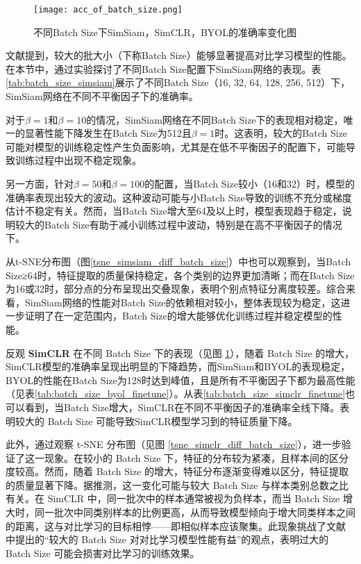 \documentclass[master]{thesis-uestc}
\begin{document}
\begin{figure}[h]
    \centering
    \texttt{[image: acc\_of\_batch\_size.png]}
    \caption{不同Batch Size下SimSiam，SimCLR，BYOL的准确率变化图}
    \label{acc_of_batch_size}
\end{figure}

文献\cite{chen2020simple}提到，较大的批大小（下称Batch Size）能够显著提高对比学习模型的性能。在本节中，通过实验探讨了不同Batch Size配置下SimSiam网络的表现。表\ref{tab:batch_size_simsiam}展示了不同Batch Size（16, 32, 64, 128, 256, 512）下，SimSiam网络在不同不平衡因子下的准确率。

对于$\beta=1$和$\beta=10$的情况，SimSiam网络在不同Batch Size下的表现相对稳定，唯一的显著性能下降发生在Batch Size为512且$\beta=1$时。这表明，较大的Batch Size可能对模型的训练稳定性产生负面影响，尤其是在低不平衡因子的配置下，可能导致训练过程中出现不稳定现象。

另一方面，针对$\beta=50$和$\beta=100$的配置，当Batch Size较小（16和32）时，模型的准确率表现出较大的波动。这种波动可能与小Batch Size导致的训练不充分或梯度估计不稳定有关。然而，当Batch Size增大至64及以上时，模型表现趋于稳定，说明较大的Batch Size有助于减小训练过程中波动，特别是在高不平衡因子的情况下。

从t-SNE分布图（图\ref{tsne_simsiam_diff_batch_size}）中也可以观察到，当Batch Size≥64时，特征提取的质量保持稳定，各个类别的边界更加清晰；而在Batch Size为16或32时，部分点的分布呈现出交叠现象，表明个别点特征分离度较差。综合来看，SimSiam网络的性能对Batch Size的依赖相对较小，整体表现较为稳定，这进一步证明了在一定范围内，Batch Size的增大能够优化训练过程并稳定模型的性能。

反观 \textbf{SimCLR} 在不同 Batch Size 下的表现（见图 \ref{acc_of_batch_size}），随着 Batch Size 的增大，SimCLR模型的准确率呈现出明显的下降趋势，而SimSiam和BYOL的表现稳定，BYOL的性能在Batch Size为128时达到峰值，且是所有不平衡因子下都为最高性能（见表\ref{tab:batch_size_byol_finetune}）。从表\ref{tab:batch_size_simclr_finetune}也可以看到，当Batch Size增大，SimCLR在不同不平衡因子的准确率全线下降。表明较大的 Batch Size 可能导致SimCLR模型学习到的特征质量下降。

此外，通过观察 t-SNE 分布图（见图 \ref{tsne_simclr_diff_batch_size}），进一步验证了这一现象。在较小的 Batch Size 下，特征的分布较为紧凑，且样本间的区分度较高。然而，随着 Batch Size 的增大，特征分布逐渐变得难以区分，特征提取的质量显著下降。据推测，这一变化可能与较大 Batch Size 与样本类别总数之比有关。在 SimCLR 中，同一批次中的样本通常被视为负样本，而当 Batch Size 增大时，同一批次中同类别样本的比例更高，从而导致模型倾向于增大同类样本之间的距离，这与对比学习的目标相悖——即相似样本应该聚集。此现象挑战了文献 \cite{chen2020simple} 中提出的“较大的 Batch Size 对对比学习模型性能有益”的观点，表明过大的 Batch Size 可能会损害对比学习的训练效果。
\end{document}
